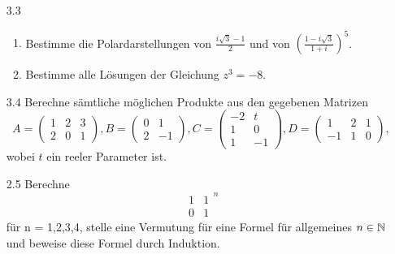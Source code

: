 \documentclass{HM}
\begin{document}
\begin{enumerate}
\item [3.3]
\begin{enumerate}
\item Bestimme die Polardarstellungen von $\frac{i\sqrt{3} - 1}{2}$ und von $\left(\frac{1-i\sqrt{3}}{1+i}\right)^5$.
\item Bestimme alle Lösungen der Gleichung $z^3 = -8$.
\end{enumerate}
\item [3.4] Berechne sämtliche möglichen Produkte aus den gegebenen Matrizen
$$
A=\begin{pmatrix}
1 & 2 & 3\\
2 & 0 & 1
\end{pmatrix},
B=\begin{pmatrix}
0 & 1\\
2 & -1
\end{pmatrix},
C=\begin{pmatrix}
-2 & t\\
1 & 0\\
1 & -1
\end{pmatrix},
D=\begin{pmatrix}
1 & 2 & 1\\
-1 & 1 & 0
\end{pmatrix},
$$
wobei $t$ ein reeler Parameter ist.
\item [2.5] Berechne
$$\begin{matrix}
1 & 1\\
0 & 1
\end{matrix}^n$$
für n = 1,2,3,4, stelle eine Vermutung für eine Formel für allgemeines $n\in\mathbb{N}$ und beweise diese Formel durch Induktion.
\end{enumerate}
\end{document}

